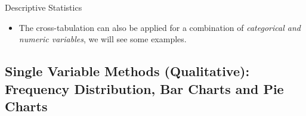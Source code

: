 \documentclass[8pt, usepdftitle=false]{beamer}
\begin{document}
\begin{frame}[allowframebreaks]{Descriptive Statistics}
\begin{itemize}






\medskip

\item The cross-tabulation can also be applied for a combination of \emph{categorical and numeric variables}, we will see some examples.



\end{itemize}
\end{frame}




\subsection{Single Variable Methods (Qualitative): Frequency Distribution, Bar Charts and Pie Charts}
\frame{\subsectionpage}
\end{document}
